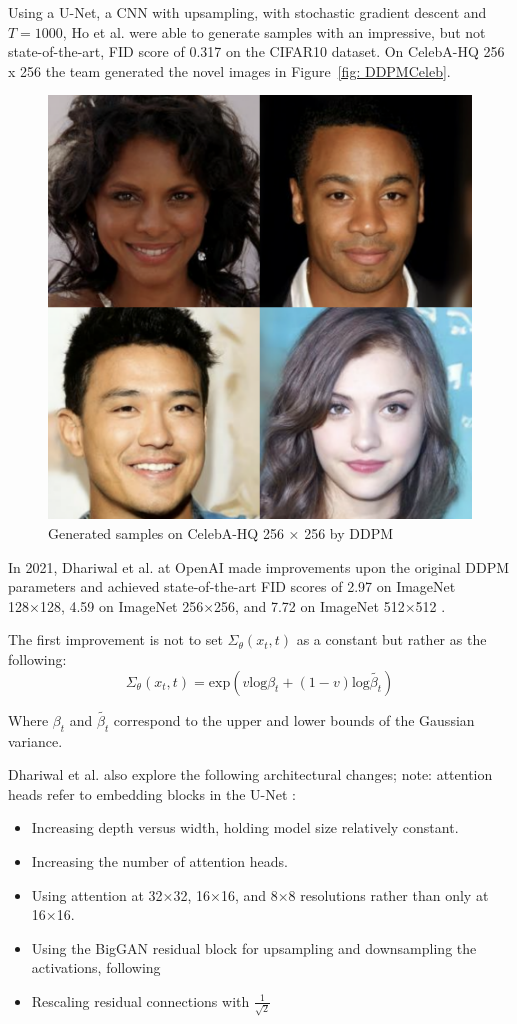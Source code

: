 \documentclass[%
 reprint,
 amsmath,amssymb,
 aps,
]{revtex4-2}
\begin{document}
Using a U-Net, a CNN with upsampling, with stochastic gradient descent and $T=1000$, Ho et al. were able to generate samples with an impressive, but not state-of-the-art, FID score of 0.317 on the CIFAR10 dataset. On CelebA-HQ 256 x 256 the team generated the novel images in Figure~\ref{fig: DDPMCeleb}.

\begin{figure}[h]
    \includegraphics[width=0.6\columnwidth]{celeb.png}
    \caption{\label{fig:DDPMCeleb} Generated samples on CelebA-HQ 256 × 256 by DDPM \cite{ho2020denoising}}
\end{figure}



In 2021, Dhariwal et al. at OpenAI made improvements upon the original DDPM parameters and achieved state-of-the-art FID scores of 2.97 on ImageNet 128×128, 4.59 on ImageNet 256×256, and 7.72 on ImageNet 512×512 \cite{dhariwal2021diffusion}.

The first improvement is not to set $\Sigma_\theta(x_t, t) $ as a constant but rather as the following:
\begin{equation}
\Sigma_\theta(x_t, t) = \mathrm{exp}(v \mathrm{log} \beta_t + (1 - v) \mathrm{log} \tilde{\beta_t})
\end{equation}


Where $\beta_t$ and  $\tilde{\beta_t}$ correspond to the upper and lower bounds of the Gaussian variance.


Dhariwal et al. also explore the following architectural changes; note: attention heads refer to embedding blocks in the U-Net  \cite{dhariwal2021diffusion}:
\begin{itemize}
\item Increasing depth versus width, holding model size relatively constant.
\item Increasing the number of attention heads.
\item Using attention at 32×32, 16×16, and 8×8 resolutions rather than only at 16×16.
\item Using the BigGAN residual block for upsampling and downsampling the activations, following
\item Rescaling residual connections with $\frac{1}{\sqrt{2}}$
\end{itemize}
\end{document}
